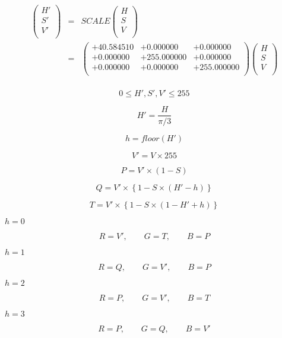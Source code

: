 \documentclass{article}
\begin{document}
\begin{eqnarray*} \left( \begin{array}{l} H' \\ S' \\ V' \\ \end{array} \right) &=& SCALE \left( \begin{array}{l} H \\ S \\ V \\ \end{array} \right) \\ &=& \left( \begin{array}{lll} +40.584510 & +0.000000 & +0.000000 \\ +0.000000 & +255.000000 & +0.000000 \\ +0.000000 & +0.000000 & +255.000000 \\ \end{array} \right) \left( \begin{array}{l} H \\ S \\ V \\ \end{array} \right) \\ \end{eqnarray*}
\pagebreak

\[ 0 \le H', S', V' \le 255 \]
\pagebreak

\[ H'=\frac{H}{\pi/3} \]
\pagebreak

\[ h=floor\left( H' \right) \]
\pagebreak

\[ V' = V \times 255 \]
\pagebreak

\[ P=V'\times \left(1 - S\right) \]
\pagebreak

\[ Q=V'\times \left\{1 - S\times \left(H' - h\right)\right\} \]
\pagebreak

\[ T=V'\times \left\{1 - S\times \left(1 - H' + h\right)\right\} \]
\pagebreak

$h=0$
\pagebreak

\[ R = V',\qquad G = T,\qquad B = P \]
\pagebreak

$h=1$
\pagebreak

\[ R = Q,\qquad G = V',\qquad B = P \]
\pagebreak

$h=2$
\pagebreak

\[ R = P,\qquad G = V',\qquad B = T \]
\pagebreak

$h=3$
\pagebreak

\[ R = P,\qquad G = Q,\qquad B = V' \]
\pagebreak
\end{document}

